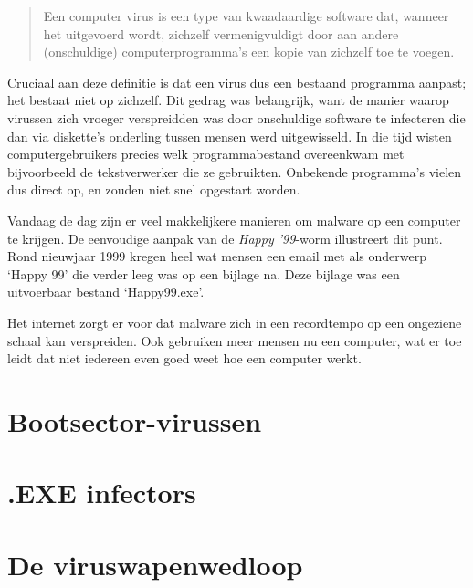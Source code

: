 \begin{quotation}
Een computer virus is een type van kwaadaardige software dat, wanneer het uitgevoerd wordt, zichzelf vermenigvuldigt door aan andere (onschuldige) computerprogramma's een kopie van zichzelf toe te voegen.
\end{quotation}

Cruciaal aan deze definitie is dat een virus dus een bestaand programma aanpast; het bestaat niet op zichzelf. Dit gedrag was belangrijk, want de manier waarop virussen zich vroeger verspreidden was door onschuldige software te infecteren die dan via diskette's onderling tussen mensen werd uitgewisseld. In die tijd wisten computergebruikers precies welk programmabestand overeenkwam met bijvoorbeeld de tekstverwerker die ze gebruikten. Onbekende programma's vielen dus direct op, en zouden niet snel opgestart worden.

Vandaag de dag zijn er veel makkelijkere manieren om malware op een computer te krijgen. De eenvoudige aanpak van de \emph{Happy '99}-worm illustreert dit punt. Rond nieuwjaar 1999 kregen heel wat mensen een email met als onderwerp `Happy 99' die verder leeg was op een bijlage na. Deze bijlage was een uitvoerbaar bestand `Happy99.exe'. 

Het internet zorgt er voor dat malware zich in een recordtempo op een ongeziene schaal kan verspreiden. Ook gebruiken meer mensen nu een computer, wat er toe leidt dat niet iedereen even goed weet hoe een computer werkt.

\section{Bootsector-virussen}


\section{.EXE infectors}


\section{De viruswapenwedloop}
